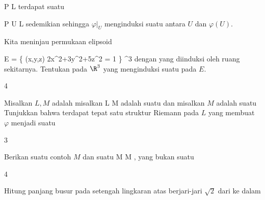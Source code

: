 \mavergleichskette
{\vergleichskette
{ P
}
{ \in }{ L
}
{  }{
}
{    }{
}
{   }{
}
}
{}{}{}
terdapat suatu

\mavergleichskette
{\vergleichskette
{ P
}
{ \in }{ U
}
{ \subseteq }{ L
}
{    }{
}
{   }{
}
}
{}{}{}
sedemikian sehingga $\varphi  \vert_U$ menginduksi suatu
antara $U$ dan $\varphi(U)$.


{}
{

Kita meninjau permukaan elipsoid

\mavergleichskettedisp
{\vergleichskette
{ E
}
{ =} { \left\{ (x,y,z)  \mid   2x^2+3y^2+5z^2 = 1        \right\}
}
{ \subset} { \R^3
}
{ } {
}
{ } {
}
}
{}{}{}
dengan
yang diinduksi oleh ruang sekitarnya. Tentukan
pada $\R^3$ yang menginduksi suatu
pada $E$.

}
{} {}

{4}
{

Misalkan $L,M$ adalah
misalkan
\maabbdisp {\varphi} { L } { M
} {}
adalah suatu
dan misalkan $M$ adalah suatu
Tunjukkan bahwa terdapat tepat satu struktur Riemann pada $L$ yang membuat $\varphi$ menjadi suatu

}
{} {}

{3}
{

Berikan suatu contoh
$M$ dan suatu
\maabbdisp {\varphi} { M } { M
} {,}
yang bukan suatu

}
{} {}

{4}
{

Hitung panjang busur pada setengah lingkaran atas berjari-jari $\sqrt{2}$ dari
 ke
 dalam

}
{} {}

